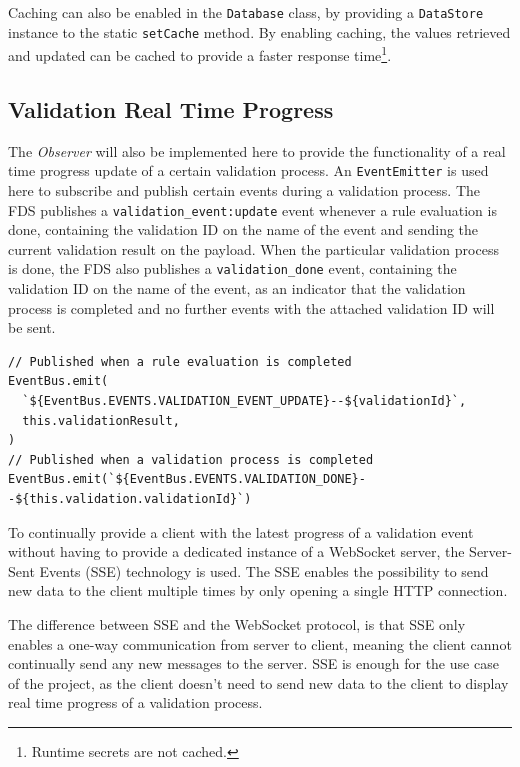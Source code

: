     Caching can also be enabled in the \verb;Database; class, by providing a \verb;DataStore; instance to the static \verb;setCache; method. By enabling caching, the values retrieved and updated can be cached to provide a faster response time\footnote{Runtime secrets are not cached.}. 

  \subsection{Validation Real Time Progress}
    \label{impl_sse}
  
    The \emph{Observer} \autocite[pp. 293-303]{gamma-1995} will also be implemented here to provide the functionality of a real time progress update of a certain validation process. An \verb;EventEmitter; is used here to subscribe and publish certain events during a validation process. The FDS publishes a \verb;validation_event:update; event whenever a rule evaluation is done, containing the validation ID on the name of the event and sending the current validation result on the payload. When the particular validation process is done, the FDS also publishes a \verb;validation_done; event, containing the validation ID on the name of the event, as an indicator that the validation process is completed and no further events with the attached validation ID will be sent. 

    \begin{lstlisting}[style=es6, caption={Publishing events to the EventEmitter on certain validation events (TypeScript)}]
// Published when a rule evaluation is completed
EventBus.emit(
  `${EventBus.EVENTS.VALIDATION_EVENT_UPDATE}--${validationId}`,
  this.validationResult,
)
// Published when a validation process is completed
EventBus.emit(`${EventBus.EVENTS.VALIDATION_DONE}--${this.validation.validationId}`)
    \end{lstlisting}
    
    To continually provide a client with the latest progress of a validation event without having to provide a dedicated instance of a WebSocket server, the Server-Sent Events (SSE)\autocite{rfc8895} technology is used. The SSE enables the possibility to send new data to the client multiple times by only opening a single HTTP connection. 
    
    The difference between SSE and the WebSocket protocol, is that SSE only enables a one-way communication from server to client, meaning the client cannot continually send any new messages to the server. SSE is enough for the use case of the project, as the client doesn't need to send new data to the client to display real time progress of a validation process.

